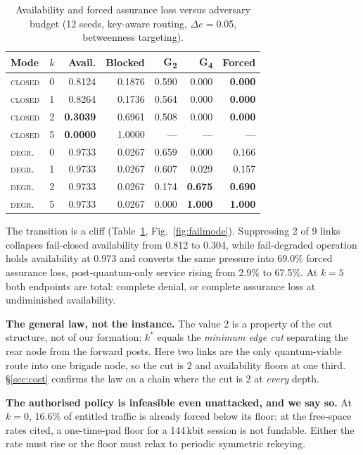 \documentclass[conference]{IEEEtran}
\newcommand{\GII}{G\textsubscript{2}}
\newcommand{\GIV}{G\textsubscript{4}}
\begin{document}
\begin{table}[t]
\caption{Availability and forced assurance loss versus adversary budget
(12 seeds, key-aware routing, $\Delta e=0.05$, betweenness targeting).}
\label{tab:head}
\centering\footnotesize
\begin{tabular}{@{}llrrrrr@{}}
\toprule
Mode & $k$ & Avail. & Blocked & \GII & \GIV & Forced\\
\midrule
\textsc{closed} & 0 & 0.8124 & 0.1876 & 0.590 & 0.000 & \textbf{0.000}\\
\textsc{closed} & 1 & 0.8264 & 0.1736 & 0.564 & 0.000 & \textbf{0.000}\\
\textsc{closed} & 2 & \textbf{0.3039} & 0.6961 & 0.508 & 0.000 & \textbf{0.000}\\
\textsc{closed} & 5 & \textbf{0.0000} & 1.0000 & --- & --- & ---\\
\textsc{degr.}  & 0 & 0.9733 & 0.0267 & 0.659 & 0.000 & 0.166\\
\textsc{degr.}  & 1 & 0.9733 & 0.0267 & 0.607 & 0.029 & 0.157\\
\textsc{degr.}  & 2 & 0.9733 & 0.0267 & 0.174 & \textbf{0.675} & \textbf{0.690}\\
\textsc{degr.}  & 5 & 0.9733 & 0.0267 & 0.000 & \textbf{1.000} & \textbf{1.000}\\
\bottomrule
\end{tabular}
\end{table}

The transition is a cliff (Table~\ref{tab:head}, Fig.~\ref{fig:failmode}).
Suppressing 2 of 9 links collapses fail-closed availability from 0.812 to 0.304,
while fail-degraded operation holds availability at 0.973 and converts the same
pressure into 69.0\% forced assurance loss, post-quantum-only service rising from
2.9\% to 67.5\%. At $k=5$ both endpoints are total: complete denial, or complete
assurance loss at undiminished availability.

\textbf{The general law, not the instance.} The value 2 is a property of the cut
structure, not of our formation: $k^\ast$ equals the \emph{minimum edge cut}
separating the rear node from the forward posts. Here two links are the only
quantum-viable route into one brigade node, so the cut is 2 and availability
floors at one third. \S\ref{sec:cost} confirms the law on a chain where the cut is
2 at \emph{every} depth.

\textbf{The authorised policy is infeasible even unattacked, and we say so.} At
$k=0$, 16.6\% of entitled traffic is already forced below its floor: at the
free-space rates cited, a one-time-pad floor for a 144\,kbit session is not
fundable. Either the rate must rise or the floor must relax to periodic symmetric
rekeying.
\end{document}

